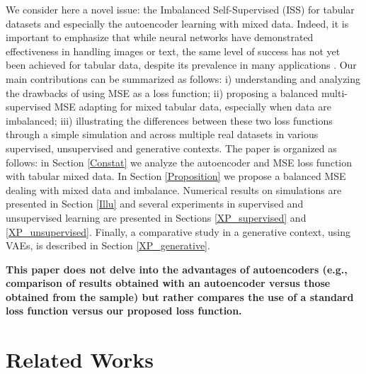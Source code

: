 \documentclass{article}
\theoremstyle{definition}
\begin{document}
We consider here a novel issue: the Imbalanced Self-Supervised (ISS) for tabular datasets and especially the autoencoder learning with mixed data. Indeed, it is important to emphasize that while neural networks have demonstrated effectiveness in handling images or text, the same level of success has not yet been achieved for tabular data, despite its prevalence in many applications \citep{shwartz2022tabular}.
Our main contributions can be summarized as follows: i) understanding and analyzing the drawbacks of using MSE as a loss function; ii) proposing a balanced multi-supervised MSE adapting for mixed tabular data, especially when data are imbalanced; iii) illustrating the differences between these two loss functions through a simple simulation and across multiple real datasets in various supervised, unsupervised and generative contexts. 
The paper is organized as follows: 
in Section \ref{Constat} we analyze the autoencoder and MSE loss function with tabular mixed data. 
In Section \ref{Proposition} we propose a balanced MSE dealing with mixed data and imbalance. 
Numerical results on simulations are presented in Section \ref{Illu} and several experiments in supervised and unsupervised learning are presented in Sections \ref{XP_supervised} and \ref{XP_unsupervised}. Finally, a comparative study in a generative context, using VAEs, is described in Section \ref{XP_generative}.

\textbf{This paper does not delve into the advantages of autoencoders (e.g., comparison of results obtained with an autoencoder versus those obtained from the sample) but rather compares the use of a standard loss function versus our proposed loss function.} 


\section{Related Works}
\end{document}

